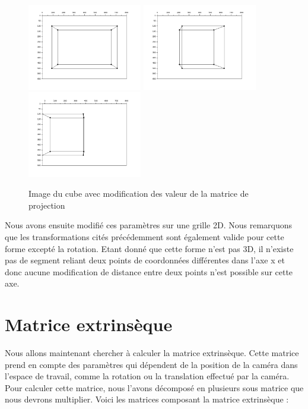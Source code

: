 \documentclass[a4paper,11pt]{article}
\begin{document}
  \begin{figure}[H]
    \center
    \includegraphics[width=5cm]{ProjectionTaille.png}
    \includegraphics[width=5cm]{ProjectionRotation.png}
    \includegraphics[width=5cm]{ProjectionTranslation.png}
    \caption{Image du cube avec modification des valeur de la matrice de projection}
  \end{figure}
  
  Nous avons ensuite modifié ces paramètres sur une grille 2D. Nous remarquons que 
  les transformations cités précédemment sont également valide pour cette forme 
  excepté la rotation. Etant donné que cette forme n'est pas 3D, il n'existe pas 
  de segment reliant deux points de coordonnées différentes dans l'axe x et donc aucune
  modification de distance entre deux points n'est possible sur cette axe.

  \section{Matrice extrinsèque}
  
  Nous allons maintenant chercher à calculer la matrice extrinsèque. Cette matrice prend en compte
  des paramètres qui dépendent de la position de la caméra dans l'espace de travail, comme la rotation
  ou la translation effectué par la caméra. Pour calculer cette matrice, nous l'avons décomposé en 
  plusieurs sous matrice que nous devrons multiplier. Voici les matrices composant la matrice extrinsèque :\\
  
\end{document}

